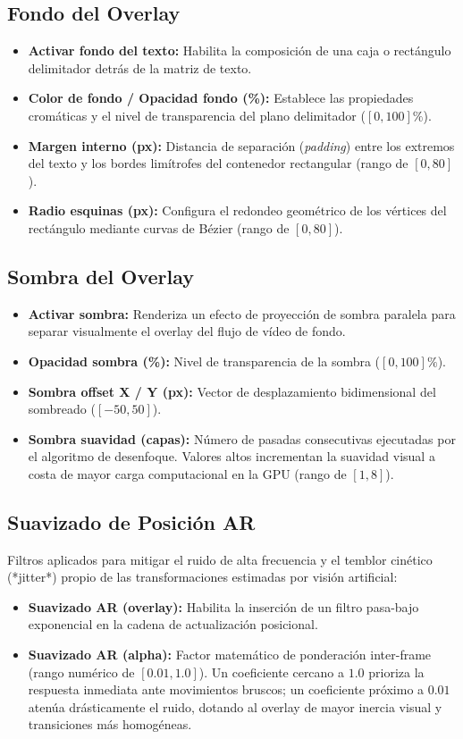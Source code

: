 \subsection{Fondo del Overlay}
\begin{itemize}
    \item \textbf{Activar fondo del texto:} Habilita la composición de una caja o rectángulo delimitador detrás de la matriz de texto.
    \item \textbf{Color de fondo / Opacidad fondo (\%):} Establece las propiedades cromáticas y el nivel de transparencia del plano delimitador ($[ 0, 100 ]\%$).
    \item \textbf{Margen interno (px):} Distancia de separación (\textit{padding}) entre los extremos del texto y los bordes limítrofes del contenedor rectangular (rango de $[ 0, 80 ]$).
    \item \textbf{Radio esquinas (px):} Configura el redondeo geométrico de los vértices del rectángulo mediante curvas de Bézier (rango de $[ 0, 80 ]$).
\end{itemize}

\subsection{Sombra del Overlay}
\begin{itemize}
    \item \textbf{Activar sombra:} Renderiza un efecto de proyección de sombra paralela para separar visualmente el overlay del flujo de vídeo de fondo.
    \item \textbf{Opacidad sombra (\%):} Nivel de transparencia de la sombra ($[ 0, 100 ]\%$).
    \item \textbf{Sombra offset X / Y (px):} Vector de desplazamiento bidimensional del sombreado ($[ -50, 50 ]$).
    \item \textbf{Sombra suavidad (capas):} Número de pasadas consecutivas ejecutadas por el algoritmo de desenfoque. Valores altos incrementan la suavidad visual a costa de mayor carga computacional en la GPU (rango de $[ 1, 8 ]$).
\end{itemize}

\subsection{Suavizado de Posición AR}
Filtros aplicados para mitigar el ruido de alta frecuencia y el temblor cinético (*jitter*) propio de las transformaciones estimadas por visión artificial:
\begin{itemize}
    \item \textbf{Suavizado AR (overlay):} Habilita la inserción de un filtro pasa-bajo exponencial en la cadena de actualización posicional.
    \item \textbf{Suavizado AR (alpha):} Factor matemático de ponderación inter-frame (rango numérico de $[ 0.01, 1.0 ]$). Un coeficiente cercano a $1.0$ prioriza la respuesta inmediata ante movimientos bruscos; un coeficiente próximo a $0.01$ atenúa drásticamente el ruido, dotando al overlay de mayor inercia visual y transiciones más homogéneas.
\end{itemize}

